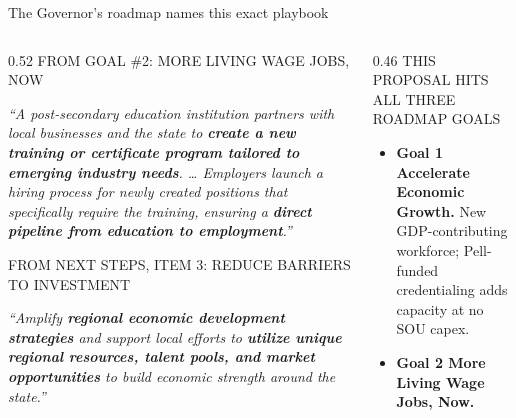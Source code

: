 \documentclass[aspectratio=169,11pt]{beamer}
\newcommand{\eyebrow}[1]{%
  {\sffamily\fontsize{7.5pt}{9pt}\selectfont
   \color{textMuted}%
   \MakeUppercase{#1}%
  }%
}
\newcommand{\theEyebrowText}{}
\newcommand{\frametitleEyebrow}[1]{\renewcommand{\theEyebrowText}{#1}}
\begin{document}
\frametitleEyebrow{Alignment / Oregon's Prosperity Roadmap, Dec 2025}
\begin{frame}{The Governor's roadmap names this exact playbook}
  \begin{columns}[T,onlytextwidth]
    \begin{column}{0.52\textwidth}
      \rmfamily\fontsize{9.5pt}{12.5pt}\selectfont
      \color{textPrimary}
      \eyebrow{From Goal \#2: More Living Wage Jobs, Now}
      \vspace{4pt}\par
      {\itshape\color{textSecondary}\fontsize{10pt}{13pt}\selectfont
      ``A post-secondary education institution partners
      with local businesses and the state to \textbf{create
      a new training or certificate program tailored to
      emerging industry needs}. \ldots{} Employers launch a
      hiring process for newly created positions that
      specifically require the training, ensuring a
      \textbf{direct pipeline from education to employment}.''\par}
      \vspace{6pt}
      \eyebrow{From Next Steps, item 3: Reduce Barriers to Investment}
      \vspace{4pt}\par
      {\itshape\color{textSecondary}\fontsize{10pt}{13pt}\selectfont
      ``Amplify \textbf{regional economic development
      strategies} and support local efforts to \textbf{utilize
      unique regional resources, talent pools, and market
      opportunities} to build economic strength around the
      state.''\par}
    \end{column}
    \begin{column}{0.46\textwidth}
      \rmfamily\fontsize{9.8pt}{13pt}\selectfont
      \color{textPrimary}
      \eyebrow{this proposal hits all three roadmap goals}
      \vspace{3pt}
      \begin{itemize}\itemsep2pt
        \item \textbf{Goal 1 \textemdash{} Accelerate Economic Growth.}
              New GDP-contributing workforce; Pell-funded
              credentialing adds capacity at no SOU capex.
        \item \textbf{Goal 2 \textemdash{} More Living Wage Jobs, Now.}

\end{itemize}
\end{column}
\end{columns}
\end{frame}
\end{document}
